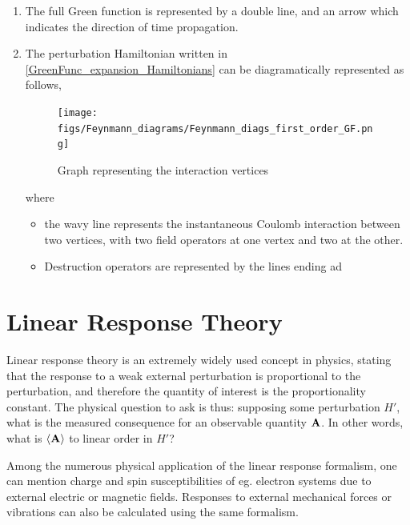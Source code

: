 \documentclass{homework}
\begin{document}
\begin{enumerate}
    \item The full Green function is represented by a double line, and an arrow which indicates the direction of time propagation. 
    
    \item The perturbation Hamiltonian written in \cref{GreenFunc_expansion_Hamiltonians} can be diagramatically represented as follows, 
    
    \begin{figure}[H]
        \centering
        \texttt{[image: figs/Feynmann\_diagrams/Feynmann\_diags\_first\_order\_GF.png]}
        \caption{Graph representing the interaction vertices}\label{fig:Feynmann_diags_first_order_GF}
    \end{figure}
    
    where
    
    \begin{itemize}
        \item the wavy line represents the instantaneous Coulomb interaction between two vertices, with two field operators at one vertex and two at the other.
        \item Destruction operators are represented by the lines ending ad 
    \end{itemize}
    
    
    
\end{enumerate}


\clearpage

\section{Linear Response Theory}

Linear response theory is an extremely widely used concept in physics, stating that the response to a weak external perturbation is proportional to the perturbation, and therefore the quantity of interest is the proportionality constant. The physical question to ask is thus: supposing some perturbation $H'$, what is the measured consequence for an observable quantity ${\bf A}$. In other words, what is $\langle {\bf A} \rangle$ to linear order in $H'$? 

Among the numerous physical application of the linear response formalism, one can mention charge and spin susceptibilities of eg. electron systems due to external electric or magnetic fields. Responses to external mechanical forces or vibrations can also be calculated using the same formalism. \\
\end{document}
